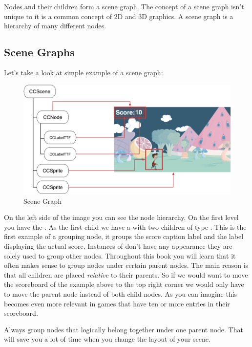 Nodes and their children form a scene graph. The concept of a scene graph isn't
unique to \cocos{} it is a common concept of 2D and 3D graphics. A scene graph
is a hierarchy of many different nodes. 

\subsection{Scene Graphs}
Let's take a look at simple example of a scene graph:

\begin{figure}[H]
		\centering
		\includegraphics[width=0.9\linewidth]{images/cocos2d/SceneGraph.png}     
		\caption{\cocos{} Scene Graph}
\end{figure}

On the left side of the image you can see the node hierarchy. On the first level
you have the \ccscene{}. As the first child we have a \ccnode{} with two
children of type \cclabel{}. This \ccnode{} is the first example of a grouping
node, it groups the score caption label and the label displaying the actual
score. Instances of \ccnode{} don't have any appearance they are solely used to
group other nodes. Throughout this book you will learn that it often makes sense
to group nodes under certain parent nodes. The main reason is that all children are placed
\textit{relative} to their parents. So if we would want to move the scoreboard
of the example above to the top right corner we would only have to move the
parent node instead of both child nodes. As you can imagine this becomes
even more relevant in games that have ten or more entries in their scoreboard.

\begin{details} 
Always group nodes that logically belong together under one parent node. That
will save you a lot of time when you change the layout of your scene.
\end{details}

